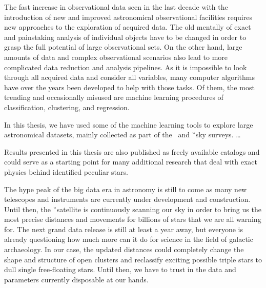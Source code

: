 
The fast increase in observational data seen in the last decade with the introduction of new and improved astronomical observational facilities requires new approaches to the exploration of acquired data. The old mentally of exact and painstaking analysis of individual objects have to be changed in order to grasp the full potential of large observational sets. On the other hand, large amounts of data and complex observational scenarios also lead to more complicated data reduction and analysis pipelines. As it is impossible to look through all acquired data and consider all variables, many computer algorithms have over the years been developed to help with those tasks. Of them, the most trending and occasionally misused are machine learning procedures of classification, clustering, and regression.

In this thesis, we have used some of the machine learning tools to explore large astronomical datasets, mainly collected as part of the \Gh\ and \G\ sky surveys. \ldots

Results presented in this thesis are also published as freely available catalogs and could serve as a starting point for many additional research that deal with exact physics behind identified peculiar stars.

The hype peak of the big data era in astronomy is still to come as many new telescopes and instruments are currently under development and construction. Until then, the \G\ satellite is continuously scanning our sky in order to bring us the most precise distances and movements for billions of stars that we are all warning for. The next grand data release is still at least a year away, but everyone is already questioning how much more can it do for science in the field of galactic archaeology. In our case, the updated distances could completely change the shape and structure of open clusters and reclassify exciting possible triple stars to dull single free-floating stars. Until then, we have to trust in the data and parameters currently disposable at our hands.
